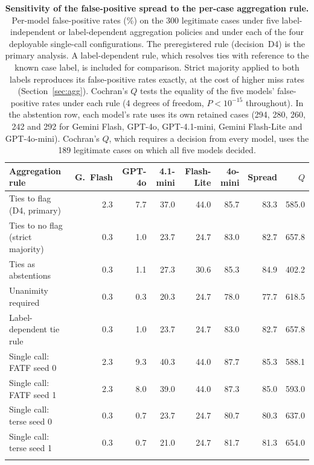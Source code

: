 \documentclass[pdflatex,sn-basic,Numbered]{sn-jnl}
\begin{document}
\begin{table}[t]
\caption{\textbf{Sensitivity of the false-positive spread to the per-case aggregation rule.} Per-model false-positive rates (\%) on the 300 legitimate cases under five label-independent or label-dependent aggregation policies and under each of the four deployable single-call configurations. The preregistered rule (decision~D4) is the primary analysis. A label-dependent rule, which resolves ties with reference to the known case label, is included for comparison. Strict majority applied to both labels reproduces its false-positive rates exactly, at the cost of higher miss rates (Section~\ref{sec:agg}). Cochran's $Q$ tests the equality of the five models' false-positive rates under each rule (4 degrees of freedom, $P<10^{-15}$ throughout). In the abstention row, each model's rate uses its own retained cases (294, 280, 260, 242 and 292 for Gemini Flash, GPT-4o, GPT-4.1-mini, Gemini Flash-Lite and GPT-4o-mini). Cochran's $Q$, which requires a decision from every model, uses the 189 legitimate cases on which all five models decided.}\label{tab:agg}
\setlength{\tabcolsep}{3pt}
\begin{tabular*}{\textwidth}{@{\extracolsep\fill}lrrrrrrr}
\toprule
Aggregation rule & G.\ Flash & GPT-4o & 4.1-mini & Flash-Lite & 4o-mini & Spread & $Q$ \\
\midrule
Ties to flag (D4, primary)                & 2.3 & 7.7 & 37.0 & 44.0 & 85.7 & 83.3 & 585.0 \\
Ties to no flag (strict majority)         & 0.3 & 1.0 & 23.7 & 24.7 & 83.0 & 82.7 & 657.8 \\
Ties as abstentions                       & 0.3 & 1.1 & 27.3 & 30.6 & 85.3 & 84.9 & 402.2 \\
Unanimity required                        & 0.3 & 0.3 & 20.3 & 24.7 & 78.0 & 77.7 & 618.5 \\
Label-dependent tie rule               & 0.3 & 1.0 & 23.7 & 24.7 & 83.0 & 82.7 & 657.8 \\
\midrule
Single call: FATF seed 0                  & 2.3 & 9.3 & 40.3 & 44.0 & 87.7 & 85.3 & 588.1 \\
Single call: FATF seed 1                  & 2.3 & 8.0 & 39.0 & 44.0 & 87.3 & 85.0 & 593.0 \\
Single call: terse seed 0                 & 0.3 & 0.7 & 23.7 & 24.7 & 80.7 & 80.3 & 637.0 \\
Single call: terse seed 1                 & 0.3 & 0.7 & 21.0 & 24.7 & 81.7 & 81.3 & 654.0 \\
\botrule
\end{tabular*}
\end{table}
\end{document}
